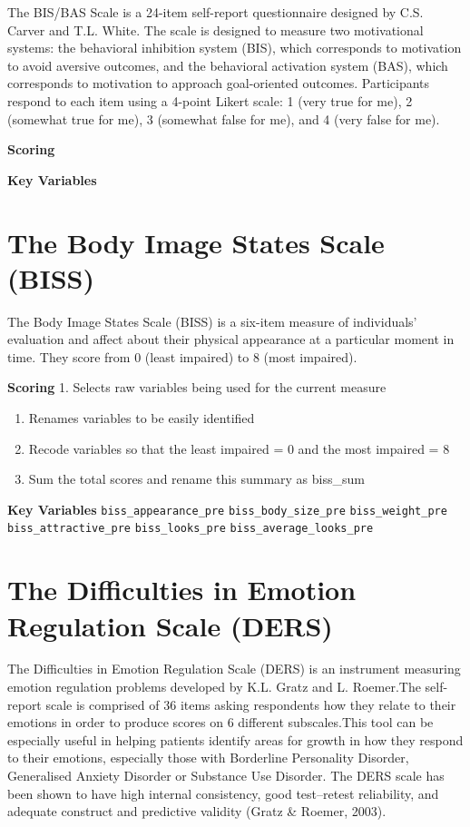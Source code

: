 \documentclass[
]{book}
\begin{document}
The BIS/BAS Scale is a 24-item self-report questionnaire designed by C.S. Carver and T.L. White. The scale is designed to measure two motivational systems: the behavioral inhibition system (BIS), which corresponds to motivation to avoid aversive outcomes, and the behavioral activation system (BAS), which corresponds to motivation to approach goal-oriented outcomes. Participants respond to each item using a 4-point Likert scale: 1 (very true for me), 2 (somewhat true for me), 3 (somewhat false for me), and 4 (very false for me).

\textbf{Scoring}

\textbf{Key Variables}

\hypertarget{the-body-image-states-scale-biss}{%
\section{The Body Image States Scale (BISS)}\label{the-body-image-states-scale-biss}}

The Body Image States Scale (BISS) is a six-item measure of individuals' evaluation and affect about their physical appearance at a particular moment in time. They score from 0 (least impaired) to 8 (most impaired).

\textbf{Scoring}
1. Selects raw variables being used for the current measure

\begin{enumerate}
\def\labelenumi{\arabic{enumi}.}
\setcounter{enumi}{1}
\item
  Renames variables to be easily identified
\item
  Recode variables so that the least impaired = 0 and the most impaired = 8
\item
  Sum the total scores and rename this summary as biss\_sum
\end{enumerate}

\textbf{Key Variables}
\texttt{biss\_appearance\_pre}
\texttt{biss\_body\_size\_pre}
\texttt{biss\_weight\_pre}
\texttt{biss\_attractive\_pre}
\texttt{biss\_looks\_pre}
\texttt{biss\_average\_looks\_pre}

\hypertarget{the-difficulties-in-emotion-regulation-scale-ders}{%
\section{The Difficulties in Emotion Regulation Scale (DERS)}\label{the-difficulties-in-emotion-regulation-scale-ders}}

The Difficulties in Emotion Regulation Scale (DERS) is an instrument measuring emotion regulation problems developed by K.L. Gratz and L. Roemer.The self-report scale is comprised of 36 items asking respondents how they relate to their emotions in order to produce scores on 6 different subscales.This tool can be especially useful in helping patients identify areas for growth in how they respond to their emotions, especially those with Borderline Personality Disorder, Generalised Anxiety Disorder or Substance Use Disorder. The DERS scale has been shown to have high internal consistency, good test--retest reliability, and adequate construct and predictive validity (Gratz \& Roemer, 2003).
\end{document}
